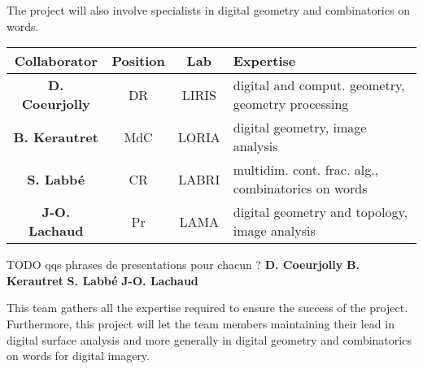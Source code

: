 The project will also involve specialists in digital geometry and combinatorics on words. 
\begin{table}[h]
\small
\centering
\begin{tabular}{|cccl|}
\hline
Collaborator & Position & Lab & Expertise \\ \hline
\hline
\textbf{D. Coeurjolly} & DR & LIRIS & digital and comput. geometry, geometry processing \\ \hline
\textbf{B. Kerautret} & MdC & LORIA & digital geometry, image analysis \\ \hline
\textbf{S. Labb\'{e}} & CR & LABRI & multidim. cont. frac. alg., combinatorics on words \\ \hline
\textbf{J-O. Lachaud} & Pr & LAMA & digital geometry and topology, image analysis \\ \hline
\hline
\end{tabular}
\normalsize
\end{table}

TODO qqs phrases de presentations pour chacun ?
\textbf{D. Coeurjolly} 
\textbf{B. Kerautret} 
\textbf{S. Labb\'{e}} 
\textbf{J-O. Lachaud}


This team gathers all the expertise required to ensure the success of the project.
Furthermore, this project will let the team members maintaining their lead in digital surface analysis 
and more generally in digital geometry and combinatorics on words for digital imagery. 


